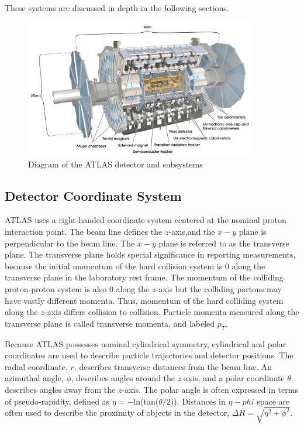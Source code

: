 These systems are discussed in depth in the following sections.
\begin{figure}[!t]
\centering 
\includegraphics[width=0.9\textwidth]{figs/lhc/ATLAS-eps-converted-to.pdf}
\caption{ Diagram of the ATLAS detector and subsystems 
}
\label{figure:lhc_atlas}
\end{figure}


\subsection{Detector Coordinate System}

ATLAS uses a right-handed  coordinate system centered at the nominal proton interaction point. The beam line defines the $z$-axis,and the $x-y$ plane is perpendicular to the beam line. The $x-y$ plane is referred to as the transverse plane. The transverse plane holds special significance in reporting measurements, because the initial momentum of the hard collision system is 0 along the transverse plane in the laboratory rest frame. The momentum of the colliding proton-proton system is also 0 along the $z$-axis but the colliding partons may have vastly different momenta. Thus, momentum of the hard colliding system along the $z$-axis differs collision to collision. Particle momenta measured along the transverse plane is called transverse momenta, and labeled $p_T$.  

Because ATLAS possesses nominal cylindrical symmetry, cylindrical and polar coordinates are used to describe particle trajectories and detector positions. The radial coordinate, $r$, describes transverse distances from the beam line. An azimuthal angle, $\phi$, describes angles around the $z$-axis, and a polar coordinate $\theta$ describes angles away from the $z$-axis. The polar angle is often expressed in terms of pseudo-rapidity, defined as $\eta=-$ln(tan($\theta/2$)). Distances in $\eta-phi$ space are often used to describe the proximity of objects in the detector, $\Delta R = \sqrt{\eta^2 + \phi^2}$.

